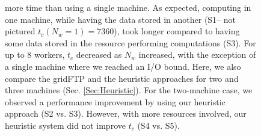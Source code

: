\documentclass{rspublic}
\newcommand{\fixme}[1]{ { \bf{ ***FIXME: #1
}} } \newcommand{\jhanote}[1]{ {\textcolor{red} { ***Jha: #1 }}}
\newcommand{\micnote}[1]{ {\textcolor{blue} { ***Michael: #1 }}}
\newcommand{\betynote}[1]{ {\textcolor{orange} { ***Bety: #1 }}}
\newcommand{\jhanote}[1]{} \newcommand{\micnote}[1]{}\newcommand{\betynote}[1]{} \newcommand{\fixme}[1]{}
\begin{document}
\begin{figure}[!ht]
\begin{center}
{more time than using a single machine. As expected, computing in one
machine, while having the data stored in another (S1-- not pictured $t_c(N_w=1)=7360$), took longer
compared to having some data stored in the resource performing
computations (S3). For up to 8 workers, $t_c$ decreased as $N_w$
increased, with the exception of a single machine where we reached an
I/O bound. Here, we also compare the gridFTP and the heuristic
approaches for two and three machines (Sec. \ref{Sec:Heuristic}). For
the two-machine case, we observed a performance improvement by using our
heuristic approach (S2 vs. S3). However, with more resources involved,
our heuristic system did not improve $t_c$ (S4 vs. S5).}
\label{Fig:ExpIConventionalLocal}
\end{center}
\vspace{-0.3cm}
\end{figure}





\vspace{-0.3cm}

\end{document}
